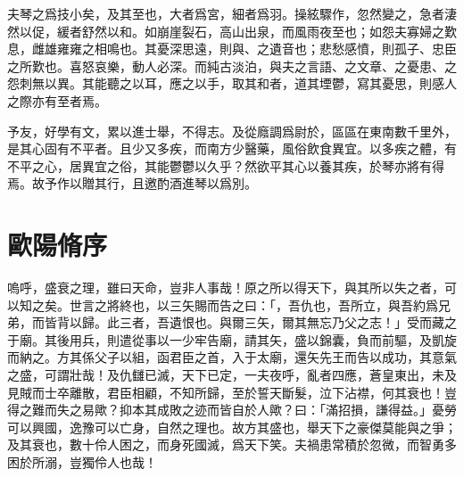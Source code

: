 夫琴之爲技小矣，及其至也，大者爲宮，細者爲羽。操絃驟作，忽然變之，急者淒然以促，緩者舒然以和。如崩崖裂石，高山出泉，而風雨夜至也；如怨夫寡婦之歎息，雌雄雍雍之相鳴也。其憂深思遠，則與、之遺音也；悲愁感憤，則孤子、忠臣之所歎也。喜怒哀樂，動人必深。而純古淡泊，與夫之言語、之文章、之憂患、之怨刺無以異。其能聽之以耳，應之以手，取其和者，道其堙鬱，寫其憂思，則感人之際亦有至者焉。%

予友，好學有文，累以進士舉，不得志。及從廕調爲尉於，區區在東南數千里外，是其心固有不平者。且少又多疾，而南方少醫藥，風俗飲食異宜。以多疾之體，有不平之心，居異宜之俗，其能鬱鬱以久乎？然欲平其心以養其疾，於琴亦將有得焉。故予作以贈其行，且邀酌酒進琴以爲別。

\theendnotes

\section[五代史伶官傳序\quad{\small 歐陽脩}]{{\normalsize 歐陽脩}\quad{}序}
嗚呼，盛衰之理，雖曰天命，豈非人事哉！原之所以得天下，與其所以失之者，可以知之矣。世言之將終也，以三矢賜而告之曰：「，吾仇也，吾所立，與吾約爲兄弟，而皆背以歸。此三者，吾遺恨也。與爾三矢，爾其無忘乃父之志！」受而藏之于廟。其後用兵，則遣從事以一少牢告廟，請其矢，盛以錦囊，負而前驅，及凱旋而納之。方其係父子以組，函君臣之首，入于太廟，還矢先王而告以成功，其意氣之盛，可謂壯哉！及仇讎已滅，天下已定，一夫夜呼，亂者四應，蒼皇東出，未及見賊而士卒離散，君臣相顧，不知所歸，至於誓天斷髮，泣下沾襟，何其衰也！豈得之難而失之易歟？抑本其成敗之迹而皆自於人歟？曰：「滿招損，謙得益。」憂勞可以興國，逸豫可以{亡}身，自然之理也。故方其盛也，舉天下之豪傑莫能與之爭；及其衰也，數十伶人困之，而身死國滅，爲天下笑。夫禍患常積於忽微，而智勇多困於所溺，豈獨伶人也哉！%

\theendnotes

